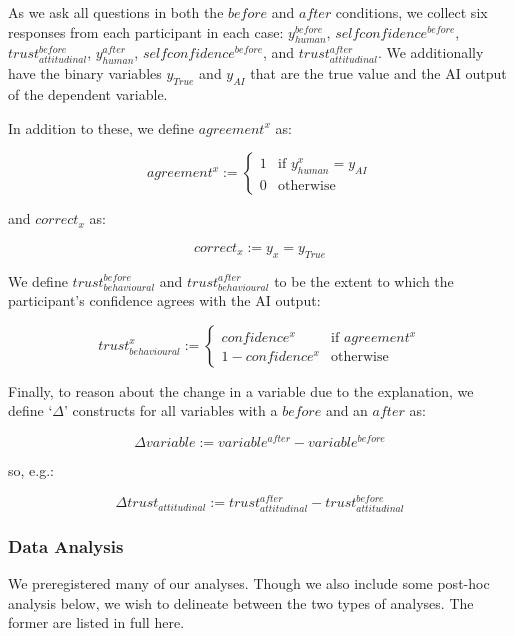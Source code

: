 As we ask all questions in both the $before$ and $after$ conditions, we collect six responses from each participant in each case: $y_{human}^{before}$, $selfconfidence^{before}$, $trust_{attitudinal}^{before}$, $y_{human}^{after}$, $selfconfidence^{before}$, and $trust_{attitudinal}^{after}$.  We additionally have the binary variables $y_{True}$ and $y_{AI}$ that are the true value and the AI output of the dependent variable.

In addition to these, we define $agreement^{x}$ as:

\begin{equation}
    agreement^{x} := \begin{cases}
        1 & \text{if } y_{human}^{x} = y_{AI} \\
        0 & \text{otherwise}
    \end{cases}
\end{equation}

\noindent and $correct_{x}$ as:

\begin{equation}
    correct_{x} := y_{x} = y_{True}
\end{equation}

We define $trust_{behavioural}^{before}$ and $trust_{behavioural}^{after}$ to be the extent to which the participant's confidence agrees with the AI output:

\begin{equation}
    trust_{behavioural}^{x} := \begin{cases}
        confidence^{x}      & \text{if } agreement^{x} \\
        1-confidence^{x}    & \text{otherwise}
    \end{cases}
\end{equation}

Finally, to reason about the change in a variable due to the explanation, we define `$\Delta$' constructs for all variables with a $before$ and an $after$ as:

\begin{equation}
    \Delta variable := variable^{after} - variable^{before}
\end{equation}

\noindent so, e.g.:

\begin{equation}
    \Delta trust_{attitudinal} := trust_{attitudinal}^{after} - trust_{attitudinal}^{before}
\end{equation}

\subsubsection{Data Analysis}
We preregistered many of our analyses. Though we also include some post-hoc analysis below, we wish to delineate between the two types of analyses. The former are listed in full here.

